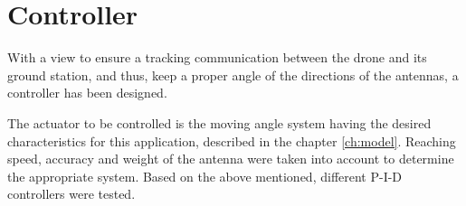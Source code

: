 \chapter{Controller}\label{sec:controller}
With a view to ensure a tracking communication between the drone and its ground station, and thus, keep a proper angle of the directions of the antennas, a controller has been designed.\par

The actuator to be controlled is the moving angle system having the desired characteristics for this application, described in the chapter \ref{ch:model}.  Reaching speed, accuracy and weight of the antenna were taken into account to determine the appropriate system. Based on the above mentioned, different P-I-D controllers were tested.\par 	









